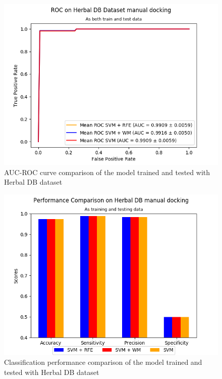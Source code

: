 \documentclass[conference]{IEEEtran}
\begin{document}
\begin{figure}
	\centering	
	\includegraphics[scale=0.45]{../images/03-evaluate-4_roc_chart.png}
	\caption{AUC-ROC curve comparison of the model trained and tested with Herbal DB dataset}
	\label{fig_roc_comparison_herbaldb_only}
\end{figure}

\begin{figure}
	\centering	
	\includegraphics[scale=0.45]{../images/03-evaluate-4_scores_chart.png}
	\caption{Classification performance comparison of the model trained and tested with Herbal DB dataset}
	\label{fig_performance_comparison_herbaldb_only}
\end{figure}	
\end{document}

